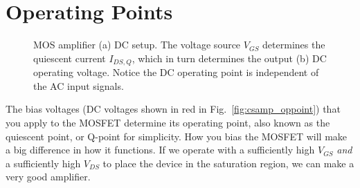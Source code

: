 \section{Operating Points}

\begin{figure}[tb]
\begin{center}
\end{center}
\caption{MOS amplifier (a) DC setup.  The voltage source $V_{GS}$ determines the quiescent current $I_{DS,Q}$, which in turn determines the output (b) DC operating voltage.  Notice the DC operating point is independent of the AC input signals.} 
\end{figure}

The bias voltages (DC voltages shown in red in Fig.~\ref{fig:csamp_oppoint}) that you apply to the MOSFET determine its operating point, also known as the quiescent point, or Q-point for simplicity.  How you bias the MOSFET will make a big difference in how it functions.  If we operate with a sufficiently high $V_{GS}$ \emph{and} a sufficiently high $V_{DS}$ to place the device in the saturation region, we can make a very good amplifier.
 





